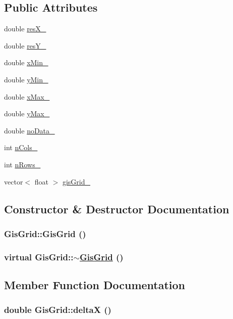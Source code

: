 \subsection*{Public Attributes}
\begin{CompactItemize}
\item 
double \hyperlink{classGisGrid_o0}{res\-X\_\-}
\item 
double \hyperlink{classGisGrid_o1}{res\-Y\_\-}
\item 
double \hyperlink{classGisGrid_o2}{x\-Min\_\-}
\item 
double \hyperlink{classGisGrid_o3}{y\-Min\_\-}
\item 
double \hyperlink{classGisGrid_o4}{x\-Max\_\-}
\item 
double \hyperlink{classGisGrid_o5}{y\-Max\_\-}
\item 
double \hyperlink{classGisGrid_o6}{no\-Data\_\-}
\item 
int \hyperlink{classGisGrid_o7}{n\-Cols\_\-}
\item 
int \hyperlink{classGisGrid_o8}{n\-Rows\_\-}
\item 
vector$<$ float $>$ \hyperlink{classGisGrid_o9}{gis\-Grid\_\-}
\end{CompactItemize}


\subsection{Constructor \& Destructor Documentation}
\hypertarget{classGisGrid_a0}{
\subsubsection[GisGrid]{\setlength{\rightskip}{0pt plus 5cm}Gis\-Grid::Gis\-Grid ()}}
\label{classGisGrid_a0}


\hypertarget{classGisGrid_a1}{
\subsubsection[$\sim$GisGrid]{\setlength{\rightskip}{0pt plus 5cm}virtual Gis\-Grid::$\sim$\hyperlink{classGisGrid}{Gis\-Grid} ()}}
\label{classGisGrid_a1}




\subsection{Member Function Documentation}
\hypertarget{classGisGrid_a11}{
\subsubsection[deltaX]{\setlength{\rightskip}{0pt plus 5cm}double Gis\-Grid::delta\-X ()}}
\label{classGisGrid_a11}


